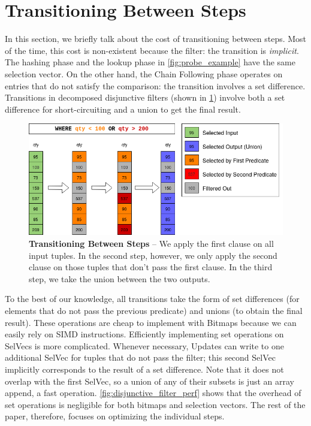 \documentclass[12pt]{cmuthesis}
\begin{document}
\section{Transitioning Between Steps}
In this section, we briefly talk about the cost of transitioning between steps. Most of the time, this cost is non-existent because the filter: the transition is \textit{implicit}. The hashing phase and the lookup phase in \cref{fig:probe_example} have the same selection vector. On the other hand, the Chain Following phase operates on entries that do not satisfy the comparison: the transition involves a set difference. Transitions in decomposed disjunctive filters \cite{pcq} (shown in \cref{fig:disjunctive_filter_howto}) involve both a set difference for short-circuiting and a union to get the final result.
\begin{figure}[t!]
    \centering
    \includegraphics[scale=0.5]{images/DisjunctionHowto.png}
    \caption{\textbf{Transitioning Between Steps} -- We apply the first clause on all input tuples. In the second step, however, we only apply the second clause on those tuples that don't pass the first clause. In the third step, we take the union between the two outputs.}
    \label{fig:disjunctive_filter_howto}
\end{figure}
To the best of our knowledge, all transitions take the form of set differences (for elements that do not pass the previous predicate) and unions (to obtain the final result). These operations are cheap to implement with Bitmaps because we can easily rely on SIMD instructions. Efficiently implementing set operations on SelVecs is more complicated.  Whenever necessary, Updates can write to one additional SelVec for tuples that do not pass the filter; this second SelVec implicitly corresponds to the result of a set difference. Note that it does not overlap with the first SelVec, so a union of any of their subsets is just an array append, a fast operation. \cref{fig:disjunctive_filter_perf} shows that the overhead of set operations is negligible for both bitmaps and selection vectors. The rest of the paper, therefore, focuses on optimizing the individual steps.
\end{document}
